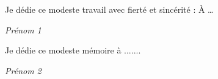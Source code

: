 
\begin{dedication}
	Je dédie ce modeste travail avec fierté et sincérité :  
	À …  




	\begin{flushright}
		\textit{Prénom 1}
	\end{flushright}
\end{dedication}






\begin{dedication}
	Je dédie ce modeste mémoire à .......
	
	
	
	
	
	
	\begin{flushright}
		\textit{Prénom 2}
	\end{flushright}
\end{dedication}

